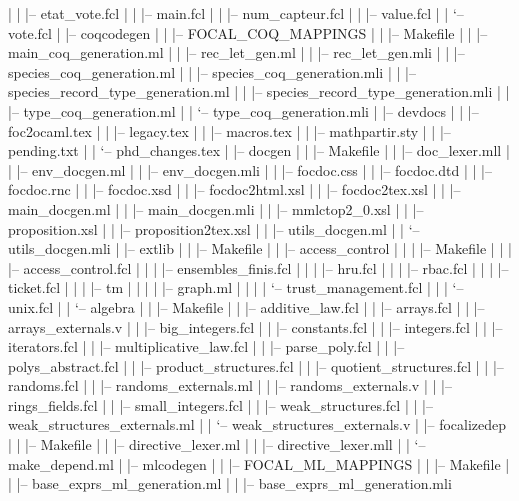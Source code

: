 \begin{itemize}
\begin{itemize}
|   |       |-- etat\_vote.fcl
|   |       |-- main.fcl
|   |       |-- num\_capteur.fcl
|   |       |-- value.fcl
|   |       `-- vote.fcl
|   |-- coqcodegen
|   |   |-- FOCAL\_COQ\_MAPPINGS
|   |   |-- Makefile
|   |   |-- main\_coq\_generation.ml
|   |   |-- rec\_let\_gen.ml
|   |   |-- rec\_let\_gen.mli
|   |   |-- species\_coq\_generation.ml
|   |   |-- species\_coq\_generation.mli
|   |   |-- species\_record\_type\_generation.ml
|   |   |-- species\_record\_type\_generation.mli
|   |   |-- type\_coq\_generation.ml
|   |   `-- type\_coq\_generation.mli
|   |-- devdocs
|   |   |-- foc2ocaml.tex
|   |   |-- legacy.tex
|   |   |-- macros.tex
|   |   |-- mathpartir.sty
|   |   |-- pending.txt
|   |   `-- phd\_changes.tex
|   |-- docgen
|   |   |-- Makefile
|   |   |-- doc\_lexer.mll
|   |   |-- env\_docgen.ml
|   |   |-- env\_docgen.mli
|   |   |-- focdoc.css
|   |   |-- focdoc.dtd
|   |   |-- focdoc.rnc
|   |   |-- focdoc.xsd
|   |   |-- focdoc2html.xsl
|   |   |-- focdoc2tex.xsl
|   |   |-- main\_docgen.ml
|   |   |-- main\_docgen.mli
|   |   |-- mmlctop2\_0.xsl
|   |   |-- proposition.xsl
|   |   |-- proposition2tex.xsl
|   |   |-- utils\_docgen.ml
|   |   `-- utils\_docgen.mli
|   |-- extlib
|   |   |-- Makefile
|   |   |-- access\_control
|   |   |   |-- Makefile
|   |   |   |-- access\_control.fcl
|   |   |   |-- ensembles\_finis.fcl
|   |   |   |-- hru.fcl
|   |   |   |-- rbac.fcl
|   |   |   |-- ticket.fcl
|   |   |   |-- tm
|   |   |   |   |-- graph.ml
|   |   |   |   `-- trust\_management.fcl
|   |   |   `-- unix.fcl
|   |   `-- algebra
|   |       |-- Makefile
|   |       |-- additive\_law.fcl
|   |       |-- arrays.fcl
|   |       |-- arrays\_externals.v
|   |       |-- big\_integers.fcl
|   |       |-- constants.fcl
|   |       |-- integers.fcl
|   |       |-- iterators.fcl
|   |       |-- multiplicative\_law.fcl
|   |       |-- parse\_poly.fcl
|   |       |-- polys\_abstract.fcl
|   |       |-- product\_structures.fcl
|   |       |-- quotient\_structures.fcl
|   |       |-- randoms.fcl
|   |       |-- randoms\_externals.ml
|   |       |-- randoms\_externals.v
|   |       |-- rings\_fields.fcl
|   |       |-- small\_integers.fcl
|   |       |-- weak\_structures.fcl
|   |       |-- weak\_structures\_externals.ml
|   |       `-- weak\_structures\_externals.v
|   |-- focalizedep
|   |   |-- Makefile
|   |   |-- directive\_lexer.ml
|   |   |-- directive\_lexer.mll
|   |   `-- make\_depend.ml
|   |-- mlcodegen
|   |   |-- FOCAL\_ML\_MAPPINGS
|   |   |-- Makefile
|   |   |-- base\_exprs\_ml\_generation.ml
|   |   |-- base\_exprs\_ml\_generation.mli

\end{itemize}
\end{itemize}
